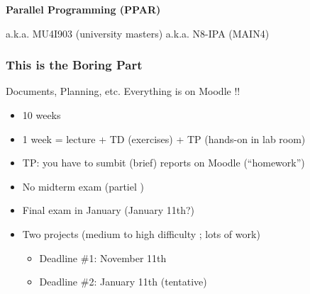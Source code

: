 \documentclass[10pt]{beamer}
\subtitle{Organisation}
\author[C. Bouillaguet]{\textbf{Charles Bouillaguet / Vincent Neiger}}
\institute[SU]{Sorbonne Université}
\date{PPAR}
\begin{document}

\begin{frame}
  
  \centering

  
  \vspace{1cm}
  
  \textbf{\Large Parallel Programming (PPAR)}

  \bigskip

  a.k.a. MU4I903 (university masters) a.k.a. N8-IPA (MAIN4)
\end{frame}


\begin{frame}
  \frametitle{This is the Boring Part}

  \begin{block}{Documents, Planning, etc.}
    Everything is on Moodle !!
  \end{block}
  
  \begin{itemize}
  \item 10 weeks
  \item 1 week = lecture + TD (exercises) + TP (hands-on in lab room)
  \item TP: you have to sumbit (brief) reports on Moodle (``homework'')
  \item No midterm exam (\og partiel \fg)
  \item Final exam in January (January 11th?)
  \item Two projects (medium to high difficulty ; lots of work)
    \begin{itemize}
    \item Deadline \#1: November 11th
    \item Deadline \#2: January 11th (tentative)
    \end{itemize}
  \end{itemize}
\end{frame}

\end{document}
